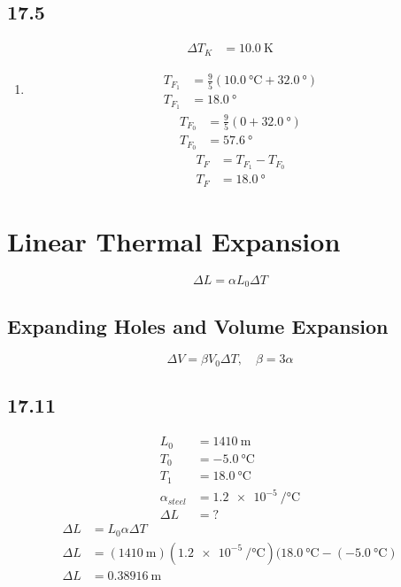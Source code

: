 \documentclass{article}
\begin{document}
\subsection{17.5}

\begin{align*}
	\Delta T_K & = \SI{10.0}{\kelvin}
\end{align*}
\begin{enumerate}[label = \textbf{(\alph*)}]
	\item
		\begin{align*}
			T_{F_1} & = \frac{9}{5}(\SI{10.0}{\celsius} + \SI{32.0}{\degree}) \\
			T_{F_1} & = \SI{18.0}{\degree}
		\end{align*}
		\begin{align*}
			T_{F_0} & = \frac{9}{5}(0 + \SI{32.0}{\degree}) \\
			T_{F_0} & = \SI{57.6}{\degree}
		\end{align*}
		\begin{align*}
			T_F & = T_{F_1} - T_{F_0} \\
			T_F & = \SI{18.0}{\degree}
		\end{align*}
\end{enumerate}

\section{Linear Thermal Expansion}

\begin{equation}
	\Delta L = \alpha L_0\Delta T
\end{equation}

\subsection{Expanding Holes and Volume Expansion}

\begin{equation}
	\Delta V = \beta V_0\Delta T, \quad \beta = 3\alpha
\end{equation}

\subsection{17.11}

\begin{align*}
	L_0 & = \SI{1410}{\meter} \\
	T_0 & = \SI{-5.0}{\celsius} \\
	T_1 & = \SI{18.0}{\celsius} \\
	\alpha_{steel} & = \SI{1.2e-5}{\per \celsius} \\
	\Delta L & = ?
\end{align*}
\begin{align*}
	\Delta L & = L_0\alpha \Delta T \\
	\Delta L & = (\SI{1410}{\meter})(\SI{1.2e-5}{\per \celsius})(\SI{18.0}{\celsius} - (\SI{-5.0}{\celsius}) \\
	\Delta L & = \SI{0.38916}{\meter}
\end{align*}
\end{document}
